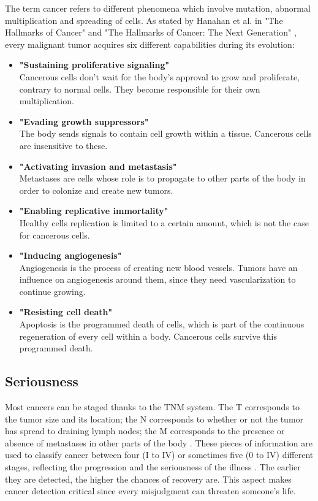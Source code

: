 The term cancer refers to different phenomena which involve mutation, abnormal multiplication and spreading of cells. As stated by Hanahan et al. in "The Hallmarks of Cancer" \cite{19} and "The Hallmarks of Cancer: The Next Generation" \cite{20}, every malignant tumor acquires six different capabilities during its evolution: 
\begin{itemize}
	\item \textbf{"Sustaining proliferative signaling"}\\ Cancerous cells don't wait for the body's approval to grow and proliferate, contrary to normal cells. They become responsible for their own multiplication.
	\item \textbf{"Evading growth suppressors"}\\
The body sends signals to contain cell growth within a tissue. Cancerous cells are insensitive to these. 
	\item \textbf{"Activating invasion and metastasis"}\\
Metastases are cells whose role is to propagate to other parts of the body in order to colonize and create new tumors. 
	\item \textbf{"Enabling replicative immortality"}\\
Healthy cells replication is limited to a certain amount, which is not the case for cancerous cells. 
	\item \textbf{"Inducing angiogenesis"}
\\Angiogenesis is the process of creating new blood vessels. Tumors have an influence on angiogenesis around them, since they need vascularization to continue growing. 
	\item \textbf{"Resisting cell death"}
\\Apoptosis is the programmed death of cells, which is part of the continuous regeneration of every cell within a body. Cancerous cells survive this programmed death. 
	
\end{itemize}


\subsection{Seriousness}

Most cancers can be staged thanks to the TNM system. The T corresponds to the tumor size and its location; the N corresponds to whether or not the tumor has spread to draining lymph nodes; the M corresponds to the presence or absence of metastases in other parts of the body \cite{21}. These pieces of information are used to classify cancer between four (I to IV) or sometimes five (0 to IV) different stages, reflecting the progression and the seriousness of the illness \cite{22}. The earlier they are detected, the higher the chances of recovery are. This aspect makes cancer detection critical since every misjudgment can threaten someone's life. 

